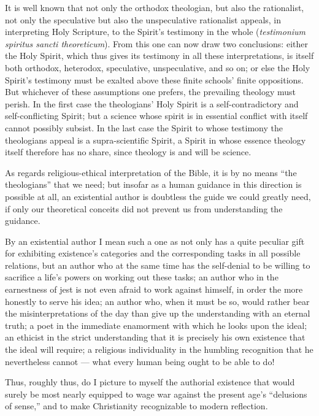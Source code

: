 \documentclass[12pt,a4paper]{book}
\begin{document}
It is well known that not only the orthodox theologian, but also the rationalist, not only
the speculative but also the unspeculative rationalist appeals, in interpreting Holy
Scripture, to
the Spirit's testimony in the whole (\textit{testimonium spiritus sancti theoreticum}).
From this one can now draw two conclusions: either the Holy Spirit, which thus gives its
testimony in all these interpretations, is itself both orthodox, heterodox, speculative,
unspeculative, and so on; or else the Holy Spirit's testimony must be exalted above these
finite schools' finite oppositions. But whichever of these
assumptions one prefers, the prevailing theology must perish. In the first case the
theologians' Holy Spirit is a self-contradictory and self-conflicting Spirit; but a
science whose spirit is in essential conflict with itself cannot possibly subsist. In the
last case the Spirit to whose testimony the theologians appeal is a supra-scientific
Spirit, a Spirit in whose essence theology itself therefore has no share, since theology
is and will be science.

As regards religious-ethical interpretation of the Bible, it is by no means ``the
theologians'' that we need; but insofar as a human guidance in this direction is possible
at all, an existential author is doubtless the guide we could greatly need, if only our
theoretical conceits did not prevent us from understanding the guidance.

By an existential author I mean such a one as not only has a quite peculiar gift for
exhibiting existence's categories and the corresponding tasks in all possible relations,
but an author who at the same time has the self-denial to be willing to sacrifice a life's
powers on working out these tasks; an author who in the earnestness of jest is not even
afraid to work against himself, in order the more honestly to serve his idea; an author
who, when it must be so, would rather bear the misinterpretations of the day than give up
the understanding with an eternal truth; a poet in the immediate enamorment with which he
looks upon the ideal; an ethicist in the strict understanding that it is precisely his own
existence that the ideal will require; a religious individuality in the humbling
recognition that he nevertheless cannot --- what every human being ought to be able to do!

Thus, roughly thus, do I picture to myself the authorial existence that would surely be
most nearly equipped to wage war against the present age's ``delusions of sense,'' and to
make Christianity recognizable to modern reflection.
\end{document}
